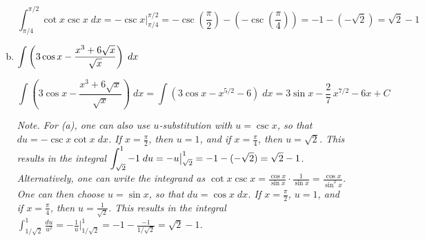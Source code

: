 \documentclass[12pt,letterpaper]{exam}
\begin{document}
\begin{questions}
\begin{enumerate}[(a)]
		\[
		\int_{\pi/4}^{\pi/2} \cot x \csc x \;dx= -\csc x \bigg|_{\pi/4}^{\pi/2}= -\csc\left( \frac{\pi}{2} \right) - \left(- \csc \left( \dfrac{\pi}{4} \right) \right)= -1 - (-\sqrt{2})= \sqrt{2} - 1
		\] \vfill
	
	\item $\displaystyle\int \left( 3 \cos x - \dfrac{x^3 + 6\sqrt{x}}{\sqrt{x}} \right) \;dx$ \vfill
	
		\[
		\int \left( 3 \cos x - \dfrac{x^3 + 6\sqrt{x}}{\sqrt{x}} \right) \;dx= \int \left( 3 \cos x -  x^{5/2} - 6 \right) \;dx= 3 \sin x - \dfrac{2}{7}\, x^{7/2} - 6x + C
		\] \vfill
	
	{\itshape\tiny Note. For (a), one can also use $u$-substitution with $u= \csc x$, so that $du= -\csc x \cot x \;dx$. If $x= \frac{\pi}{2}$, then $u= 1$, and if $x= \frac{\pi}{4}$, then $u= \sqrt{2}$. This results in the integral $\displaystyle\int_{\sqrt{2}}^1 -1 \;du= -u \big|_{\sqrt{2}}^1= -1 - (-\sqrt{2})= \sqrt{2} - 1$. Alternatively, one can write the integrand as $\cot x \csc x= \frac{\cos x}{\sin x} \cdot \frac{1}{\sin x}= \frac{\cos x}{\sin^2 x}$. One can then choose $u= \sin x$, so that $du= \cos x \;dx$. If $x= \frac{\pi}{2}$, $u= 1$, and if $x= \frac{\pi}{4}$, then $u= \frac{1}{\sqrt{2}}$. This results in the integral $\int_{1/\sqrt{2}}^1 \frac{du}{u^2}= -\frac{1}{u} \big|_{1/\sqrt{2}}^1= -1 - \frac{-1}{1/\sqrt{2}}= \sqrt{2} - 1$.}
	\end{enumerate}


\end{questions}
\end{document}
